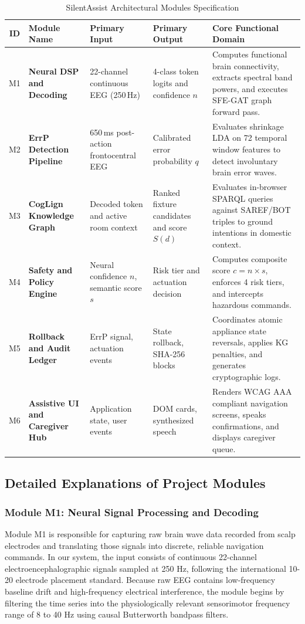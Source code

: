 \documentclass[12pt,a4paper]{report}
\begin{document}
\begin{table}[H]
\centering
\small
\caption{SilentAssist Architectural Modules Specification}
\label{tab:modules}
\begin{tabularx}{\textwidth}{c p{3.2cm} p{2.8cm} p{2.8cm} X}
\toprule
\textbf{ID} & \textbf{Module Name} & \textbf{Primary Input} & \textbf{Primary Output} & \textbf{Core Functional Domain} \\
\midrule
M1 & \textbf{Neural DSP and Decoding} & 22-channel continuous EEG (250\,Hz) & 4-class token logits and confidence $n$ & Computes functional brain connectivity, extracts spectral band powers, and executes SFE-GAT graph forward pass. \\
\addlinespace
M2 & \textbf{ErrP Detection Pipeline} & 650\,ms post-action frontocentral EEG & Calibrated error probability $q$ & Evaluates shrinkage LDA on 72 temporal window features to detect involuntary brain error waves. \\
\addlinespace
M3 & \textbf{CogLign Knowledge Graph} & Decoded token and active room context & Ranked fixture candidates and score $S(d)$ & Evaluates in-browser SPARQL queries against SAREF/BOT triples to ground intentions in domestic context. \\
\addlinespace
M4 & \textbf{Safety and Policy Engine} & Neural confidence $n$, semantic score $s$ & Risk tier and actuation decision & Computes composite score $c = n \times s$, enforces 4 risk tiers, and intercepts hazardous commands. \\
\addlinespace
M5 & \textbf{Rollback and Audit Ledger} & ErrP signal, actuation events & State rollback, SHA-256 blocks & Coordinates atomic appliance state reversals, applies KG penalties, and generates cryptographic logs. \\
\addlinespace
M6 & \textbf{Assistive UI and Caregiver Hub} & Application state, user events & DOM cards, synthesized speech & Renders WCAG AAA compliant navigation screens, speaks confirmations, and displays caregiver queue. \\
\bottomrule
\end{tabularx}
\end{table}

\subsection{Detailed Explanations of Project Modules}

\subsubsection{Module M1: Neural Signal Processing and Decoding}
Module M1 is responsible for capturing raw brain wave data recorded from scalp electrodes and translating those signals into discrete, reliable navigation commands. In our system, the input consists of continuous 22-channel electroencephalographic signals sampled at 250 Hz, following the international 10-20 electrode placement standard. Because raw EEG contains low-frequency baseline drift and high-frequency electrical interference, the module begins by filtering the time series into the physiologically relevant sensorimotor frequency range of 8 to 40 Hz using causal Butterworth bandpass filters. 
\end{document}
